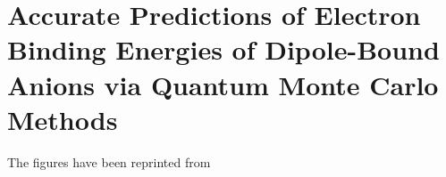 \chapter{Accurate Predictions of Electron Binding Energies of Dipole-Bound Anions via Quantum Monte Carlo Methods}
The figures have been reprinted from \cite{Hao2018}


